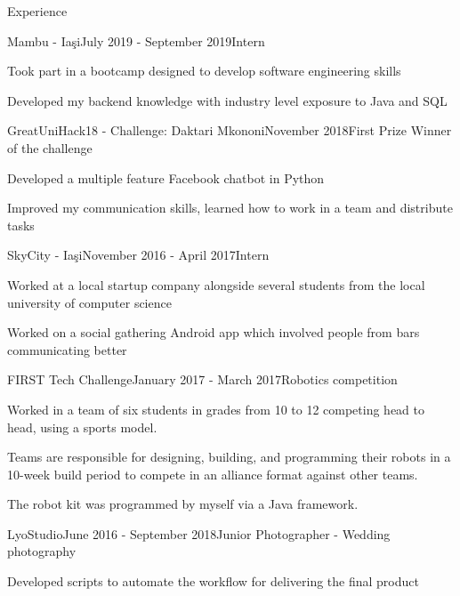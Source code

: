 \documentclass{resume} %
\begin{document}
\begin{rSection}{Experience}

\begin{rSubsection}{Mambu - Ia\c{s}i}{July 2019 - September 2019}{Intern}{}
\item Took part in a bootcamp designed to develop software engineering skills
\item Developed my backend knowledge with industry level exposure to Java and SQL
\end{rSubsection}

\begin{rSubsection}{GreatUniHack18 - Challenge: Daktari Mkononi}{November 2018}{First Prize Winner of the challenge}\item
\item Developed a multiple feature Facebook chatbot in Python
\item Improved my communication skills, learned how to work in a team and distribute tasks
\end{rSubsection}

\begin{rSubsection}{SkyCity - Ia\c{s}i}{November 2016 - April 2017}{Intern}{}
\item Worked at a local startup company alongside several students from the local university of computer science
\item Worked on a social gathering Android app which involved people from bars communicating better
\end{rSubsection}





\begin{rSubsection}{FIRST Tech Challenge}{January 2017 - March 2017}{Robotics competition}{}
\item Worked in a team of six students in grades from 10 to 12 competing head to head, using a sports model.
\item Teams are responsible for designing, building, and programming their robots in a 10-week build period to compete in an alliance format against other teams.
\item The robot kit was programmed by myself via a Java framework. 
\end{rSubsection}



\begin{rSubsection}{LyoStudio}{June 2016 - September 2018}{Junior Photographer - Wedding photography}{}
\item Developed scripts to automate the workflow for delivering the final product
\end{rSubsection}


\end{rSection}
\end{document}
